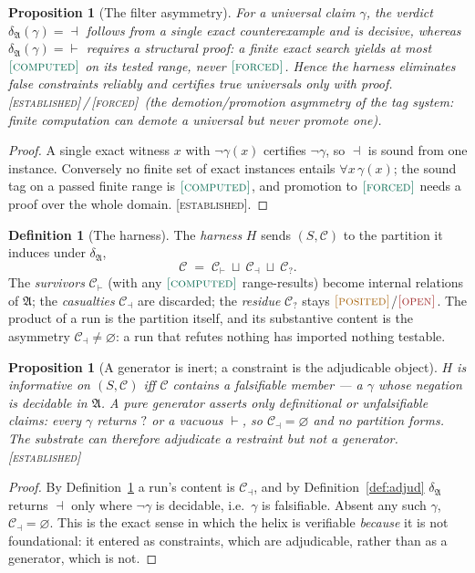 \documentclass[11pt]{article}
\theoremstyle{plain}
\newtheorem{proposition}[theorem]{Proposition}
\theoremstyle{definition}
\newtheorem{definition}[theorem]{Definition}
\theoremstyle{remark}
\newcommand{\forced}{\textup{\textcolor{forcedc}{\textsc{[forced]}}}}
\newcommand{\computed}{\textup{\textcolor{forcedc}{\textsc{[computed]}}}}
\newcommand{\posited}{\textup{\textcolor{positedc}{\textsc{[posited]}}}}
\newcommand{\openq}{\textup{\textcolor{openc}{\textsc{[open]}}}}
\newcommand{\established}{\textup{\textcolor{estabc}{\textsc{[established]}}}}
\begin{document}
\begin{proposition}[The filter asymmetry]\label{prop:filter}
For a universal claim $\gamma$, the verdict $\delta_{\mathfrak A}(\gamma)=\dashv$ follows from a \emph{single}
exact counterexample and is decisive, whereas $\delta_{\mathfrak A}(\gamma)=\vdash$ requires a structural proof:
a finite exact search yields at most $\computed$ on its tested range, never $\forced$. Hence the harness
eliminates false constraints reliably and certifies true universals only with proof. \established\,/\,\forced\
(the demotion/promotion asymmetry of the tag system: finite computation can demote a universal but never
promote one).
\end{proposition}
\begin{proof}
A single exact witness $x$ with $\neg\gamma(x)$ certifies $\neg\gamma$, so $\dashv$ is sound from one instance.
Conversely no finite set of exact instances entails $\forall x\,\gamma(x)$; the sound tag on a passed finite
range is $\computed$, and promotion to $\forced$ needs a proof over the whole domain. \established.
\end{proof}

\begin{definition}[The harness]\label{def:harness}
The \emph{harness} $H$ sends $(S,\mathcal C)$ to the partition it induces under $\delta_{\mathfrak A}$,
\[
\mathcal C \;=\; \mathcal C_{\vdash}\ \sqcup\ \mathcal C_{\dashv}\ \sqcup\ \mathcal C_{?}.
\]
The \emph{survivors} $\mathcal C_{\vdash}$ (with any $\computed$ range-results) become internal relations of
$\mathfrak A$; the \emph{casualties} $\mathcal C_{\dashv}$ are discarded; the \emph{residue} $\mathcal C_{?}$
stays $\posited$/$\openq$. The product of a run is the partition itself, and its substantive content is the
asymmetry $\mathcal C_{\dashv}\neq\varnothing$: a run that refutes nothing has imported nothing testable.
\end{definition}

\begin{proposition}[A generator is inert; a constraint is the adjudicable object]\label{prop:generator}
$H$ is informative on $(S,\mathcal C)$ iff $\mathcal C$ contains a \emph{falsifiable} member --- a $\gamma$ whose
negation is decidable in $\mathfrak A$. A pure generator asserts only definitional or unfalsifiable claims:
every $\gamma$ returns $?$ or a vacuous $\vdash$, so $\mathcal C_{\dashv}=\varnothing$ and no partition forms.
The substrate can therefore adjudicate a \emph{restraint} but not a \emph{generator}. \established
\end{proposition}
\begin{proof}
By Definition~\ref{def:harness} a run's content is $\mathcal C_{\dashv}$, and by Definition~\ref{def:adjud}
$\delta_{\mathfrak A}$ returns $\dashv$ only where $\neg\gamma$ is decidable, i.e.\ $\gamma$ is falsifiable.
Absent any such $\gamma$, $\mathcal C_{\dashv}=\varnothing$. This is the exact sense in which the helix is
verifiable \emph{because} it is not foundational: it entered as constraints, which are adjudicable, rather than
as a generator, which is not.
\end{proof}
\end{document}
